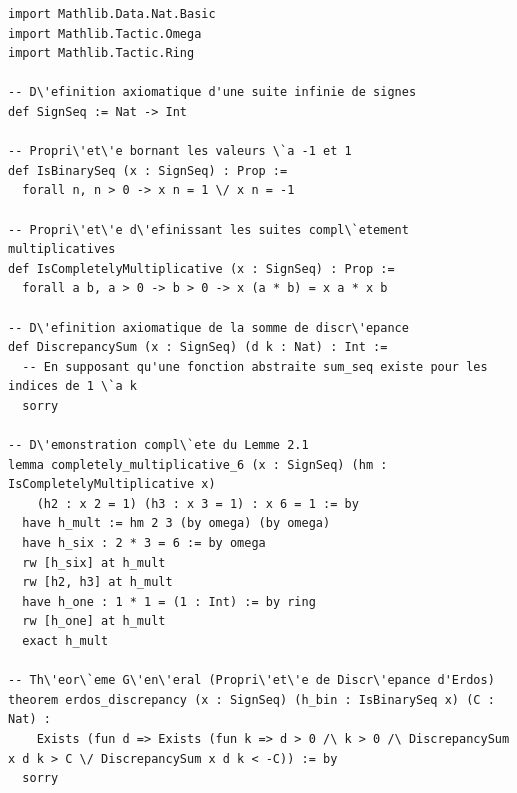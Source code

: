 \documentclass[12pt, a4paper]{article}
\begin{document}
\begin{lstlisting}[language=lean, basicstyle=\ttfamily\small, breaklines=true]
import Mathlib.Data.Nat.Basic
import Mathlib.Tactic.Omega
import Mathlib.Tactic.Ring

-- D\'efinition axiomatique d'une suite infinie de signes
def SignSeq := Nat -> Int

-- Propri\'et\'e bornant les valeurs \`a -1 et 1
def IsBinarySeq (x : SignSeq) : Prop :=
  forall n, n > 0 -> x n = 1 \/ x n = -1

-- Propri\'et\'e d\'efinissant les suites compl\`etement multiplicatives
def IsCompletelyMultiplicative (x : SignSeq) : Prop :=
  forall a b, a > 0 -> b > 0 -> x (a * b) = x a * x b

-- D\'efinition axiomatique de la somme de discr\'epance
def DiscrepancySum (x : SignSeq) (d k : Nat) : Int :=
  -- En supposant qu'une fonction abstraite sum_seq existe pour les indices de 1 \`a k
  sorry

-- D\'emonstration compl\`ete du Lemme 2.1
lemma completely_multiplicative_6 (x : SignSeq) (hm : IsCompletelyMultiplicative x)
    (h2 : x 2 = 1) (h3 : x 3 = 1) : x 6 = 1 := by
  have h_mult := hm 2 3 (by omega) (by omega)
  have h_six : 2 * 3 = 6 := by omega
  rw [h_six] at h_mult
  rw [h2, h3] at h_mult
  have h_one : 1 * 1 = (1 : Int) := by ring
  rw [h_one] at h_mult
  exact h_mult

-- Th\'eor\`eme G\'en\'eral (Propri\'et\'e de Discr\'epance d'Erdos)
theorem erdos_discrepancy (x : SignSeq) (h_bin : IsBinarySeq x) (C : Nat) :
    Exists (fun d => Exists (fun k => d > 0 /\ k > 0 /\ DiscrepancySum x d k > C \/ DiscrepancySum x d k < -C)) := by
  sorry
\end{lstlisting}
\end{document}

